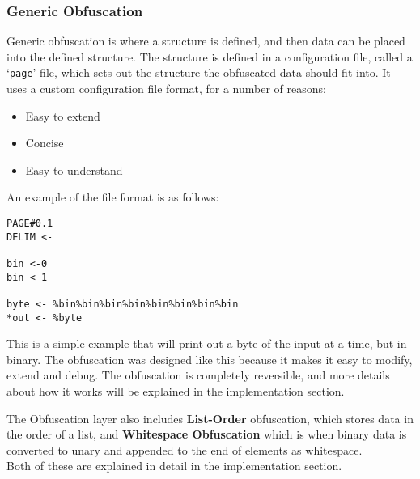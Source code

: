 \subsubsection*{Generic Obfuscation}
Generic obfuscation is where a structure is defined, and then data can be placed into the defined structure.
The structure is defined in a configuration file, called a `\texttt{page}' file, which sets out the structure the obfuscated data should fit into. It uses a custom configuration file format, for a number of reasons:
\begin{itemize}
    \item Easy to extend
    \item Concise
    \item Easy to understand
\end{itemize}
An example of the file format is as follows:
\begin{verbatim}
PAGE#0.1
DELIM <-

bin <-0
bin <-1 

byte <- %bin%bin%bin%bin%bin%bin%bin%bin
*out <- %byte
\end{verbatim}
This is a simple example that will print out a byte of the input at a time, but in binary.
The obfuscation was designed like this because it makes it easy to modify, extend and debug.
The obfuscation is completely reversible, and more details about how it works will be explained in the implementation section.\par

The Obfuscation layer also includes {\bf List-Order} obfuscation, which stores data in the order of a list, and {\bf Whitespace Obfuscation} which is when binary data is converted to unary and appended to the end of elements as whitespace.\\
Both of these are explained in detail in the implementation section.

